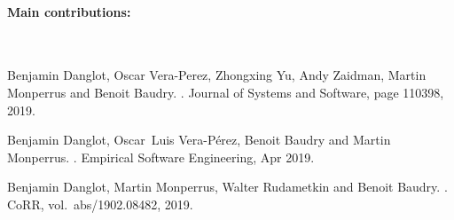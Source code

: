 \paragraph{Main contributions:}
~\\
\renewcommand\bibname{~}
\vspace{-2.8cm}
\let\oldaddcontentsline\addcontentsline%
\renewcommand{\addcontentsline}[3]{}%
\begingroup
\let\clearpage\relax
\begin{thebibliography}{xxxx}
	
	Benjamin Danglot, Oscar Vera-Perez, Zhongxing Yu, Andy Zaidman, Martin
	Monperrus and Benoit Baudry.
	.
	\newblock Journal of Systems and Software, page 110398, 2019.
	
	Benjamin Danglot, Oscar~Luis Vera-P{\'e}rez, Benoit Baudry and Martin
	Monperrus.
	.
	\newblock Empirical Software Engineering, Apr 2019.
	
	Benjamin Danglot, Martin Monperrus, Walter Rudametkin and Benoit Baudry.
	.
	\newblock CoRR, vol.~abs/1902.08482, 2019.
	
\end{thebibliography}
\endgroup
\let\addcontentsline\oldaddcontentsline%

